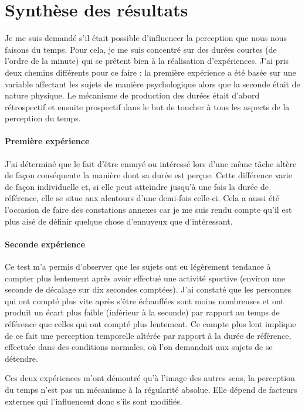 \documentclass[12pt,fleqn,oneside,french,openany]{book} %
\begin{document}
\newpage
\section{Synthèse des résultats} \label{sec:synthres}
Je me suis demandé s'il était possible d'influencer la perception que nous nous faisons du temps. Pour cela, je me suis concentré sur des durées courtes (de l'ordre de la minute) qui se prêtent bien à la réalisation d'expériences. J'ai pris deux chemins différents pour ce faire : la première expérience a été basée sur une variable affectant les sujets de manière psychologique alors que la seconde était de nature physique. Le mécanisme de production des durées était d'abord rétrospectif et ensuite prospectif dans le but de toucher à tous les aspects de la perception du temps.

\paragraph{Première expérience}
J'ai déterminé que le fait d'être ennuyé ou intéressé lors d'une même tâche altère de façon conséquente la manière dont sa durée est perçue. Cette différence varie de façon individuelle et, si elle peut atteindre jusqu'à une fois la durée de référence, elle se situe aux alentours d'une demi-fois celle-ci. Cela a aussi été l'occasion de faire des constations annexes car je me suis rendu compte qu'il est plus aisé de définir quelque chose d'ennuyeux que d'intéressant.

\paragraph{Seconde expérience}
Ce test m'a permis d'observer que les sujets ont eu légèrement tendance à compter plus lentement après avoir effectué une activité sportive (environ une seconde de décalage sur dix secondes comptées). J'ai constaté que les personnes qui ont compté plus vite après s'être échauffées sont moins nombreuses et ont produit un écart plus faible (inférieur à la seconde) par rapport au temps de référence que celles qui ont compté plus lentement. Ce compte plus lent implique de ce fait une perception temporelle altérée par rapport à la durée de référence, effectuée dans des conditions normales, où l'on demandait aux sujets de se détendre.

Ces deux expériences m'ont démontré qu'à l'image des autres sens, la perception du temps n'est pas un mécanisme à la régularité absolue. Elle dépend de facteurs externes qui l'influencent donc s'ils sont modifiés. 
\end{document}
